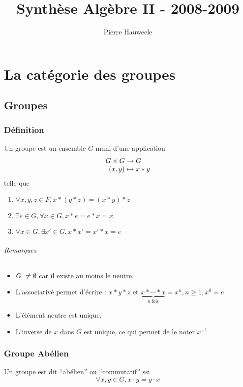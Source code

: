 \documentclass[a4paper,10pt]{report}
\author{Pierre Hauweele}
\title{Synthèse Algèbre II - 2008-2009}
\date{}
\newcommand{\underb}[2]{\underset{ #1 }{\underbrace{ #2 }}}
\begin{document}
\maketitle
\tableofcontents
\newpage
\part{La catégorie des groupes}
 \chapter{Groupes}
  \section{Définition}
   Un groupe est un ensemble $G$ muni d'une application 
   $$
   \begin{array}[t]{r@{\ }l}
     G \times G &\to G\\
     (x,y) &\mapsto x * y
   \end{array}$$
   telle que 
   \begin{enumerate}
     \item $\forall x,y,z \in F, x*(y*z)=(x*y)*z$
     \item $\exists e \in G, \forall x \in G, x*e = e*x = x$
     \item $\forall x \in G, \exists x' \in G, x*x'=x'*x=e$
   \end{enumerate}

   \paragraph{Remarques}
   \begin{itemize}
     \item $G\nobreakspace\ne \emptyset$ car il existe au moins le neutre.
     \item L'associativé permet d'écrire : $x*y*z$ et
       $\underb{n \ \mathrm{fois}}{x*\cdots*x}=x^n, n \ge 1, x^0=e$
     \item L'élément neutre est unique. 
     \item L'inverse de $x$ dans $G$ est unique,
       ce qui permet de le noter $x^{-1}$
   \end{itemize}

  \section{Groupe Abélien}
   Un groupe est dit ``abélien'' ou ``commutatif'' ssi
   $$\forall x,y \in G, x \cdot y=y \cdot x$$
\end{document}
